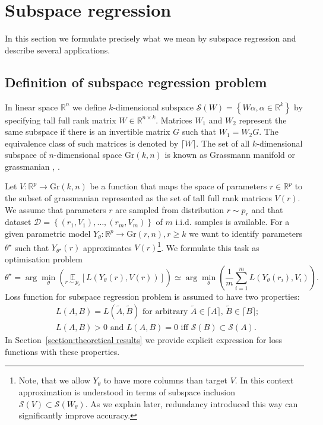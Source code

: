 \documentclass{article}
\begin{document}
\section{Subspace regression}
\label{section:subspace regression}
In this section we formulate precisely what we mean by subspace regression and describe several applications.
\subsection{Definition of subspace regression problem}
In linear space $\mathbb{R}^{n}$ we define $k$-dimensional subspace $\mathcal{S}(W) = \left\{W\alpha, \alpha \in \mathbb{R}^{k} \right\}$ by specifying tall full rank matrix $W\in\mathbb{R}^{n\times k}$. Matrices $W_1$ and $W_2$ represent the same subspace if there is an invertible matrix $G$ such that $W_1 = W_2 G$. The equivalence class of such matrices is denoted by $\lceil W\rceil$. The set of all $k$-dimensional subspace of $n$-dimensional space $\text{Gr}(k, n)$ is known as Grassmann manifold or grassmanian \cite{ciaramella2025gentle}, \cite{bendokat2024grassmann}.

Let $V:\mathbb{R}^{p}\rightarrow \text{Gr}(k, n)$ be a function that maps the space of parameters $r\in\mathbb{R}^{p}$ to the subset of grassmanian represented as the set of tall full rank matrices $V(r)$. We assume that parameters $r$ are sampled from distribution $r \sim p_{r}$ and that dataset $\mathcal{D} = \left\{\left(r_1, V_1\right),\dots,\left(r_m, V_m\right)\right\}$ of $m$ i.i.d. samples is available. For a given parametric model $Y_{\theta}:\mathbb{R}^{p}\rightarrow \text{Gr}(r, n),r \geq k$ we want to identify parameters $\theta^\star$ such that $Y_{\theta^\star}(r)$ approximates $V(r)$\footnote{Note, that we allow $Y_{\theta}$ to have more columns than target $V$. In this context approximation is understood in terms of subspace inclusion $\mathcal{S}\left(V\right) \subset \mathcal{S}\left(W_{\theta}\right)$. As we explain later, redundancy introduced this way can significantly improve accuracy.}. We formulate this task as optimisation problem
\begin{equation}
	\label{eq:subspace regression}
	\theta^\star = \arg\min_{\theta}\left(\underset{r\sim p_r}{\mathbb{E}} \left[L\left(Y_{\theta}(r), V(r)\right)\right]\right) \simeq \arg\min_{\theta}\left(\frac{1}{m}\sum_{i=1}^{m} L\left(Y_{\theta}(r_{i}), V_{i}\right)\right).
\end{equation}
Loss function for subspace regression problem is assumed to have two properties:
\begin{equation}
	\label{eq:loss_properties}
	\begin{split}
		 &L(A, B) = L(\widetilde{A}, \widetilde{B}) \text{ for arbitrary } \widetilde{A} \in \lceil A\rceil,\,\widetilde{B} \in \lceil B\rceil;\\
		 &L(A, B) > 0\text{ and } L(A, B)=0 \text{ iff }\mathcal{S}(B)\subset\mathcal{S}(A).
	\end{split}
\end{equation}
In Section~\ref{section:theoretical results} we provide explicit expression for loss functions with these properties.
\end{document}
